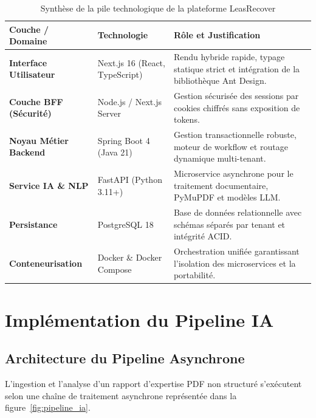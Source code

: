 \begin{table}[H]
\centering
\small
\caption{Synthèse de la pile technologique de la plateforme LeasRecover}
\label{tab:tech_stack}
\begin{tabularx}{\textwidth}{@{}L{3.5cm} L{3.5cm} Y@{}}
\toprule
\textbf{Couche / Domaine} & \textbf{Technologie} & \textbf{Rôle et Justification} \\
\midrule
\textbf{Interface Utilisateur} & Next.js 16 (React, TypeScript) & Rendu hybride rapide, typage statique strict et intégration de la bibliothèque Ant Design. \\
\addlinespace
\textbf{Couche BFF (Sécurité)} & Node.js / Next.js Server & Gestion sécurisée des sessions par cookies chiffrés  sans exposition de tokens. \\
\addlinespace
\textbf{Noyau Métier Backend} & Spring Boot 4 (Java 21) & Gestion transactionnelle robuste, moteur de workflow et routage dynamique multi-tenant. \\
\addlinespace
\textbf{Service IA \& NLP} & FastAPI (Python 3.11+) & Microservice asynchrone pour le traitement documentaire, PyMuPDF et modèles LLM. \\
\addlinespace
\textbf{Persistance} & PostgreSQL 18 & Base de données relationnelle avec schémas séparés par tenant et intégrité ACID. \\
\addlinespace
\textbf{Conteneurisation} & Docker \& Docker Compose & Orchestration unifiée garantissant l'isolation des microservices et la portabilité. \\
\bottomrule
\end{tabularx}
\end{table}

\section{Implémentation du Pipeline IA}

\subsection{Architecture du Pipeline Asynchrone}

L'ingestion et l'analyse d'un rapport d'expertise PDF non structuré s'exécutent selon une chaîne de traitement asynchrone représentée dans la figure~\ref{fig:pipeline_ia}.

